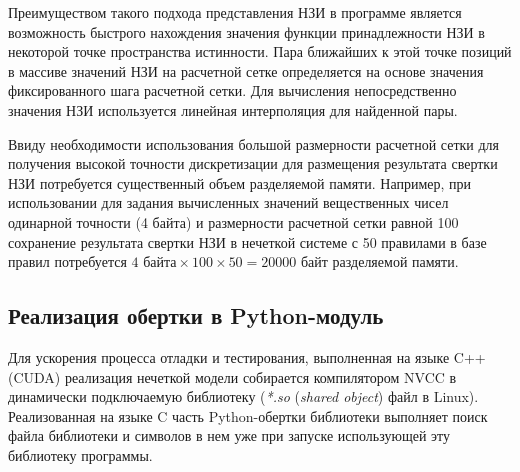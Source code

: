 Преимуществом такого подхода представления НЗИ в программе является возможность быстрого нахождения значения функции принадлежности НЗИ в некоторой точке пространства истинности. Пара ближайших к этой точке позиций в массиве значений НЗИ на расчетной сетке определяется на основе значения фиксированного шага расчетной сетки. Для вычисления непосредственно значения НЗИ используется линейная интерполяция для найденной пары.


Ввиду необходимости использования большой размерности расчетной сетки для получения высокой точности дискретизации для размещения результата свертки НЗИ потребуется существенный объем разделяемой памяти. Например, при использовании для задания вычисленных значений вещественных чисел одинарной точности (4 байта) и размерности расчетной сетки равной 100 сохранение результата свертки НЗИ в нечеткой системе с 50 правилами в базе правил потребуется $4\textrm{ байта}\times 100 \times 50 = 20000\textrm{ байт}$ разделяемой памяти.

%



\subsection{Реализация обертки в Python-модуль}

Для ускорения процесса отладки и тестирования, выполненная на языке C++ (CUDA) реализация нечеткой модели собирается компилятором NVCC в динамически подключаемую библиотеку (\textit{*.so} (\textit{shared object}) файл в Linux). Реализованная на языке C часть Python-обертки библиотеки выполняет поиск файла библиотеки и символов в нем уже при запуске использующей эту библиотеку программы.

